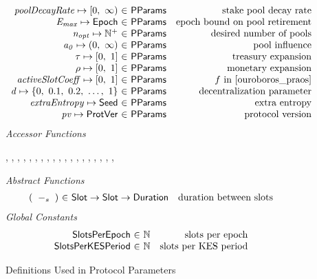 \begin{figure*}[htb]
\begin{equation*}
\begin{array}{r@{~\in~}lr}
        \var{poolDecayRate} \mapsto \nonnegReals & \PParams & \text{stake pool decay rate}\\
        \var{E_{max}} \mapsto \Epoch & \PParams & \text{epoch bound on pool retirement}\\
        \var{n_{opt}} \mapsto \Npos & \PParams & \text{desired number of pools}\\
        \var{a_0} \mapsto \posReals & \PParams & \text{pool influence}\\
        \tau \mapsto \unitInterval & \PParams & \text{treasury expansion}\\
        \rho \mapsto \unitInterval & \PParams & \text{monetary expansion}\\
        \var{activeSlotCoeff} \mapsto \unitInterval & \PParams & f\text{ in \cite{ouroboros_praos}}\\
        \var{d} \mapsto \{0,~0.1,~0.2,~\ldots,~1\} & \PParams & \text{decentralization parameter}\\
        \var{extraEntropy} \mapsto \Seed & \PParams & \text{extra entropy}\\
        \var{pv} \mapsto \ProtVer & \PParams & \text{protocol version}\\
      \end{array}
  \end{equation*}
  \emph{Accessor Functions}
  \begin{center}
    ,
    ,
    ,
    ,
    ,
    ,
    ,
    ,
    ,
    ,
    ,
    ,
    ,
    ,
    ,
    ,
    ,
    ,
    ,
  \end{center}
  \emph{Abstract Functions}
  \begin{equation*}
    \begin{array}{r@{~\in~}lr}
      (\slotminus{}{}) & \Slot \to \Slot \to \Duration
                       & \text{duration between slots}
    \end{array}
  \end{equation*}
  \emph{Global Constants}
  \begin{equation*}
    \begin{array}{r@{~\in~}lr}
      \SlotsPerEpoch & \N & \text{slots per epoch} \\
      \SlotsPerKESPeriod & \N & \text{slots per KES period} \\
    \end{array}
  \end{equation*}
  \caption{Definitions Used in Protocol Parameters}
  \label{fig:defs:protocol-parameters}
\end{figure*}

